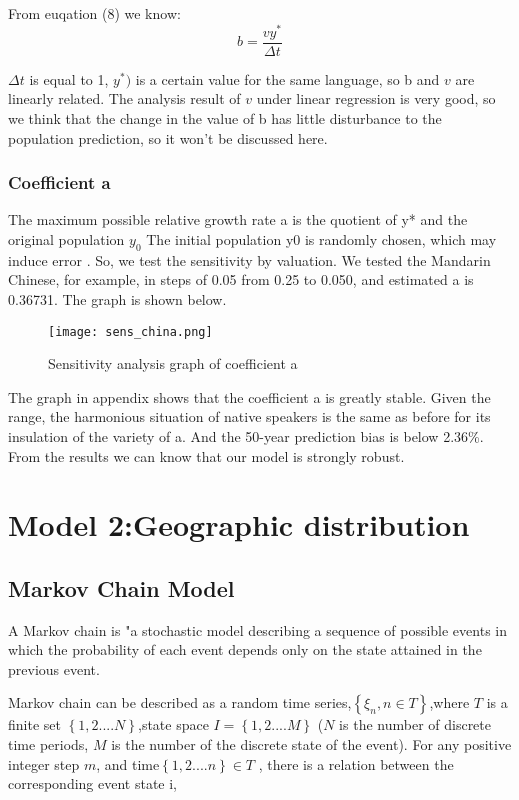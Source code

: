 \documentclass[12pt]{article}  %
\begin{document}
From euqation (8) we know:
\begin{equation}
{b = \frac{{vy^{*}}}{{{\Delta t}}}}
\end{equation}

${\Delta t}$ is equal to 1, ${y^{*})}$ is a certain value for the same language, so b and ${v}$ are linearly related. The analysis result of ${v}$ under linear regression is very good, so we think that the change in the value of b has little disturbance to the population prediction, so it won't be discussed here.
\subsubsection{Coefficient a}
The maximum possible relative growth rate a is the quotient of y* and the original population ${y_{0}}$ The initial population y0 is randomly chosen, which may induce error . So, we test the sensitivity by valuation. We tested the Mandarin Chinese, for example, in steps of 0.05 from 0.25 to 0.050, and estimated a is 0.36731. The graph is shown below.
\begin{figure}[H]
	\centering
	\texttt{[image: sens\_china.png]}
	\caption{Sensitivity analysis graph of coefficient a}\label{fig:sens_china}
\end{figure}

The graph in appendix shows that the coefficient a is greatly stable. Given the range, the harmonious situation of native speakers is the same as before for its insulation of the variety of a. And the 50-year prediction bias is below 2.36\%. 
From the results we can know that our model is strongly robust.
\section{Model 2:Geographic distribution}
\subsection{Markov Chain Model}
A Markov chain is "a stochastic model describing a sequence of possible events in which the probability of each event depends only on the state attained in the previous event. 

Markov chain can be described as a random time series,${\left\{ {{\xi _n},n \in T} \right\}}$,where  ${T}$ is a finite set ${\left\{ {1,2....N}\right\}}$,state space ${I = \left\{ {1,2....M} \right\}}$ (${N}$ is the number of discrete time periods, ${M}$ is the number of the discrete state of the event). For any positive integer step ${m}$, and time${\left\{ {1,2....n} \right\} \in T}$ , there is a relation between the corresponding event state i,
\end{document}
